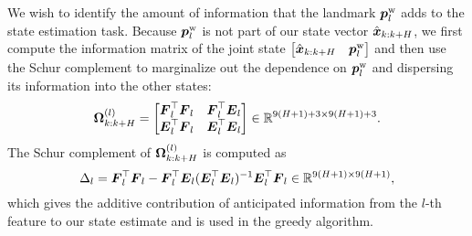 We wish to identify the amount of information that the landmark $\boldsymbol p^\text{w}_l$ adds to the state estimation task.
Because $\boldsymbol p^\text{w}_l$ is not part of our state vector $\hat{\boldsymbol x}_{k:k+H}$, we first compute the information matrix of the joint state $\begin{bmatrix}\hat{\boldsymbol x}_{k:k+H}&\boldsymbol p^\text{w}_l\end{bmatrix}$ and then use the Schur complement to marginalize out the dependence on $\boldsymbol p^\text{w}_l$ and dispersing its information into the other states:
\begin{equation*}
{\boldsymbol \Omega}_{k:k+H}^{(l)} =
\begin{bmatrix}
\boldsymbol F_l^\top\boldsymbol F_l & \boldsymbol F_l^\top\boldsymbol E_l \\
\boldsymbol E_l^\top\boldsymbol F_l & \boldsymbol E_l^\top\boldsymbol E_l
\end{bmatrix}
\in\mathbb{R}^{9(H+1)+3\times9(H+1)+3}.
\end{equation*}
The Schur complement of ${\boldsymbol \Omega}_{k:k+H}^{(l)}$ is computed as
\begin{equation}\label{eqn:schur}
\Delta_l = \boldsymbol F_l^\top\boldsymbol F_l - \boldsymbol F_l^\top\boldsymbol E_l(\boldsymbol E_l^\top\boldsymbol E_l)^{-1}\boldsymbol E_l^\top\boldsymbol F_l \in\mathbb{R}^{9(H+1)\times9(H+1)},
\end{equation}
which gives the additive contribution of anticipated information from the $l$-th feature to our state estimate and is used in the greedy algorithm.

